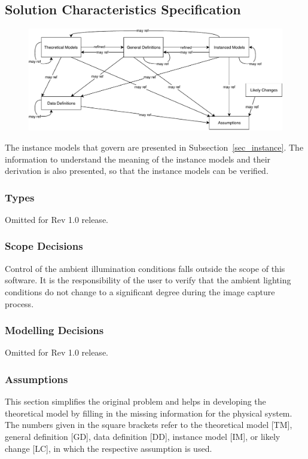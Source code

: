 \documentclass[12pt]{article}
\begin{document}
\subsection{Solution Characteristics Specification}
\begin{figure}[H]
  \includegraphics[scale=0.9]{RelationsBetweenTM_GD_IM_DD_A.pdf}
\end{figure}

The instance models that govern \progname{} are presented in
Subsection~\ref{sec_instance}.  The information to understand the meaning of the
instance models and their derivation is also presented, so that the instance
models can be verified.

\subsubsection{Types}
Omitted for Rev 1.0 release.

\subsubsection{Scope Decisions}
Control of the ambient illumination conditions falls outside the scope of this software.
It is the responsibility of the user to verify that the ambient lighting conditions do 
not change to a significant degree during the image capture process.


\subsubsection{Modelling Decisions}
Omitted for Rev 1.0 release.

\subsubsection{Assumptions} \label{sec_assumpt}
This section simplifies the original problem and helps in developing the
theoretical model by filling in the missing information for the physical system.
The numbers given in the square brackets refer to the theoretical model [TM],
general definition [GD], data definition [DD], instance model [IM], or likely
change [LC], in which the respective assumption is used.
\end{document}
